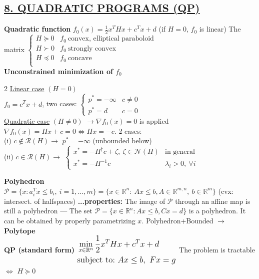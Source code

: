 \documentclass[a4paper]{article}
\begin{document}
\subsection*{\color{cyan}
\textsf{\underline{8. QUADRATIC PROGRAMS (QP)}} }
\textbf{Quadratic function} $f_0(x)=\frac{1}{2}x^T{H}x+c^T{x}+d$ (if $H=0$, $f_0$ is linear) The matrix $\begin{cases}
    H\succeq0&f_0 \ \text{convex, elliptical paraboloid}\\
    H\succ0&f_0 \ \text{strongly convex}\\
    H\preceq0&f_0 \ \text{concave}\\
\end{cases}$\\
\textbf{Unconstrained minimization of $f_0$}
\vspace{-0.3cm}
\begin{multicols}{2}
    \noindent
    \textsf{\underline{Linear case} $(H=0)$}\\
    $f_0=c^T{x}+d$, two cases: $\begin{cases}
        p^*=-\infty&{c\ne0}\\
        p^*=d&c=0
    \end{cases}$
    \newcolumn\\
    \textsf{\underline{Quadratic case} $(H\ne0)$} $\to \nabla{f_0(x)}=0$ is applied\\
    $\nabla{f_0(x)}=Hx+c=0 \iff Hx = -c$. 2 cases:\\
    (i) $c\notin\mathcal{R}(H)\to$ $p^*=-\infty$ (unbounded below)\\
    (ii) $c\in\mathcal{R}(H)\to$ $\begin{cases}
        x^*=-H^{\dagger}c+\zeta, \ \zeta \in \mathcal{N}(H)&\text{in general}\\
        x^*=-H^{-1}c&\lambda_i>0, \ \forall i
    \end{cases}$
\end{multicols}
\noindent
\textbf{Polyhedron} $\mathcal{P}=\{x: a_i^T{x}\le{b}_i, \ i=1,...,m\}=\{x\in\mathbb{R}^n: \ Ax\le{b}, A\in\mathbb{R}^{m,n}, \ b\in\mathbb{R}^m\}$ (cvx: intersect. of halfspaces)
\textbf{...properties:} The image of $\mathcal{P}$ through an affine map is still a polyhedron --- The set $\mathcal{P}=\{x\in\mathbb{R}^n:Ax\le{b}, Cx=d\}$ is a polyhedron. It can be obtained by properly parametrizing $x$. Polyhedron+Bounded $\to$ \textbf{Polytope}\\
\textbf{QP (standard form)} $\large \begin{aligned}
    &\min_{x\in\mathbb{R}^n}{\frac{1}{2}x^T{H}x+c^T{x}+d}\\
    &\text{subject to:} \ Ax\le{b}, \ Fx=g
\end{aligned}$ The problem is tractable $\iff$ $H\succeq0$
\end{document}
